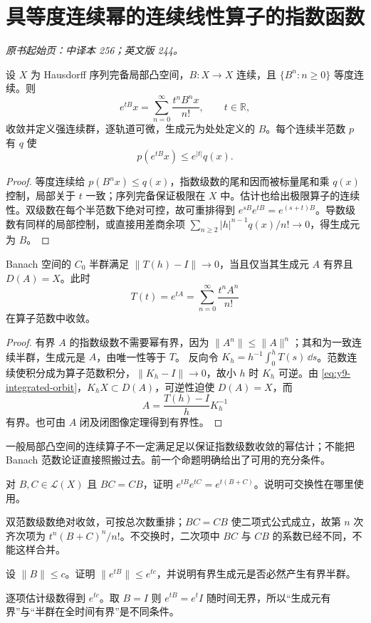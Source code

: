 \section{具等度连续幂的连续线性算子的指数函数}\label{sec:yosida-09-06}
\noindent\textit{原书起始页：中译本 256；英文版 244。}

\begin{proposition}[局部凸空间中的指数级数]\label{prop:y9-lcs-exponential}
设 $X$ 为 Hausdorff 序列完备局部凸空间，$B:X\to X$ 连续，且 $\{B^n:n\ge0\}$ 等度连续。则
\[
 e^{tB}x=\sum_{n=0}^\infty\frac{t^nB^nx}{n!},\qquad t\in\mathbb R,
\]
收敛并定义强连续群，逐轨道可微，生成元为处处定义的 $B$。每个连续半范数 $p$ 有 $q$ 使
\[
 p(e^{tB}x)\le e^{|t|}q(x).
\]
\end{proposition}
\begin{proof}
等度连续给 $p(B^nx)\le q(x)$，指数级数的尾和因而被标量尾和乘 $q(x)$ 控制，局部关于 $t$ 一致；序列完备保证极限在 $X$ 中。估计也给出极限算子的连续性。双级数在每个半范数下绝对可控，故可重排得到 $e^{sB}e^{tB}=e^{(s+t)B}$。导数级数有同样的局部控制，或直接用差商余项 $\sum_{n\ge2}|h|^{n-1}q(x)/n!\to0$，得生成元为 $B$。
\end{proof}

\begin{theorem}\label{thm:y9-uniform-continuity}
Banach 空间的 $C_0$ 半群满足 $\|T(h)-I\|\to0$，当且仅当其生成元 $A$ 有界且 $D(A)=X$。此时
\[
 T(t)=e^{tA}=\sum_{n=0}^\infty\frac{t^nA^n}{n!}
\]
在算子范数中收敛。
\end{theorem}
\begin{proof}
有界 $A$ 的指数级数不需要幂有界，因为 $\|A^n\|\le\|A\|^n$；其和为一致连续半群，生成元是 $A$，由唯一性等于 $T$。
反向令 $K_h=h^{-1}\int_0^hT(s)\,\dd s$。范数连续使积分成为算子范数积分，$\|K_h-I\|\to0$，故小 $h$ 时 $K_h$ 可逆。由 \eqref{eq:y9-integrated-orbit}，$K_hX\subset D(A)$，可逆性迫使 $D(A)=X$，而
\[
 A=\frac{T(h)-I}{h}K_h^{-1}
\]
有界。也可由 $A$ 闭及闭图像定理得到有界性。
\end{proof}

一般局部凸空间的连续算子不一定满足足以保证指数级数收敛的幂估计；不能把 Banach 范数论证直接照搬过去。前一个命题明确给出了可用的充分条件。

\begin{exercise}[可交换生成元]\label{ex:y9-commuting}
对 $B,C\in\mathcal L(X)$ 且 $BC=CB$，证明 $e^{tB}e^{tC}=e^{t(B+C)}$。说明可交换性在哪里使用。
\end{exercise}
\begin{solution}
双范数级数绝对收敛，可按总次数重排；$BC=CB$ 使二项式公式成立，故第 $n$ 次齐次项为 $t^n(B+C)^n/n!$。不交换时，二次项中 $BC$ 与 $CB$ 的系数已经不同，不能这样合并。
\end{solution}

\begin{exercise}[有界性与半群的区别]\label{ex:y9-exponential-bound}
设 $\|B\|\le c$。证明 $\|e^{tB}\|\le e^{tc}$，并说明有界生成元是否必然产生有界半群。
\end{exercise}
\begin{solution}
逐项估计级数得到 $e^{tc}$。取 $B=I$ 则 $e^{tB}=e^tI$ 随时间无界，所以“生成元有界”与“半群在全时间有界”是不同条件。
\end{solution}

